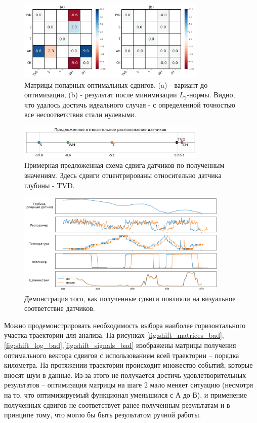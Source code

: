 \begin{figure}[H]
\centering
\includegraphics[width=0.8\textwidth]{DM/shift_matrices.png}
\caption{Матрицы попарных оптимальных сдвигов. (a) - вариант до оптимизации, (b) - результат после минимизации $L_2$-нормы. Видно, что удалось достичь идеального случая - с определенной точностью все несоответствия стали нулевыми.}
\label{fig:shift_matrices}
\end{figure}

\begin{figure}[H]
\centering
\includegraphics[width=0.8\textwidth]{DM/shift_log.png}
\caption{Примерная предложенная схема сдвига датчиков по полученным значениям. Здесь сдвиги отцентрированы относительно датчика глубины - TVD.}
\label{fig:shift_log}
\end{figure}

\begin{figure}[H]
\centering
\includegraphics[width=0.9\textwidth]{DM/shift_signals.png}
\caption{Демонстрация того, как полученные сдвиги повлияли на визуальное соответствие датчиков.}
\label{fig:shift_signals}
\end{figure}

\par
Можно продемонстрировать необходимость выбора наиболее горизонтального участка траектории для анализа. На рисунках \ref{fig:shift_matrices_bad},\ref{fig:shift_log_bad},\ref{fig:shift_signals_bad} изображены матрицы получения оптимального вектора сдвигов с использованием всей траектории – порядка километра. На протяжении траектории происходит множество событий, которые вносят шум в данные. Из-за этого не получается достичь удовлетворительных результатов – оптимизация матрицы на шаге 2 мало меняет ситуацию (несмотря на то, что оптимизируемый функционал уменьшился с А до В), и применение полученных сдвигов не соответствует ранее полученным результатам и в принципе тому, что могло бы быть результатом ручной работы.


